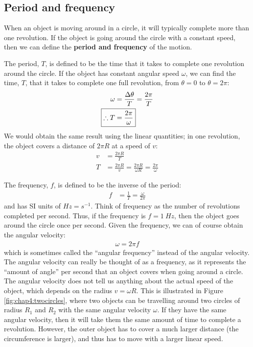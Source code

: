 \subsection{Period and frequency}
When an object is moving around in a circle, it will typically complete more than one revolution. If the object is going around the circle with a constant speed, then we can define the \textbf{period and frequency} of the motion. 

The period, $T$, is defined to be the time that it takes to complete one revolution around the circle. If the object has constant angular speed $\omega$, we can find the time, $T$, that it takes to complete one full revolution, from $\theta=0$ to $\theta=2\pi$:
\begin{align}
\omega&=\frac{\Delta \theta}{T}=\frac{2\pi}{T}\nonumber\\
\Aboxed{\therefore T&=\frac{2\pi}{\omega}}
\end{align}
We would obtain the same result using the linear quantities; in one revolution, the object covers a distance of $2\pi R$ at a speed of $v$:
\begin{align*}
v&=\frac{2\pi R}{T}\\
T&=\frac{2\pi R}{v}=\frac{2\pi R}{\omega R}=\frac{2\pi}{\omega}
\end{align*}

The frequency, $f$, is defined to be the inverse of the period:
\begin{align*}
f&=\frac{1}{T}=\frac{\omega}{2\pi}
\end{align*}
and has SI units of $\si{Hz}=\si{s^{-1}}$. Think of frequency as the number of revolutions completed per second. Thus, if the frequency is $f=\SI{1}{Hz}$, then the object goes around the circle once per second. 
 Given the frequency, we can of course obtain the angular velocity:
\begin{align*}
\omega = 2\pi f
\end{align*}
which is sometimes called the ``angular frequency'' instead of the angular velocity. The angular velocity can really be thought of as a frequency, as it represents the ``amount of angle'' per second that an object covers when going around a circle. The angular velocity does not tell us anything about the actual speed of the object, which depends on the radius $v=\omega R$. This is illustrated in Figure \ref{fig:chap4:twocircles}, where two objects can be travelling around two circles of radius $R_1$ and $R_2$ with the same angular velocity $\omega$. If they have the same angular velocity, then it will take them the same amount of time to complete a revolution. However, the outer object has to cover a much larger distance (the circumference is larger), and thus has to move with a larger linear speed.


